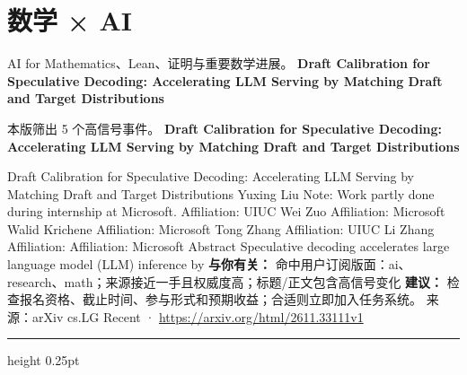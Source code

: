 \documentclass[10.5pt]{ctexart}
\begin{document}
\section*{数学 × AI}
{\color{ormuted} AI for Mathematics、Lean、证明与重要数学进展。}
\vspace{2mm}
{\LARGE\bfseries Draft Calibration for Speculative Decoding: Accelerating LLM Serving by Matching Draft and Target Distributions}\par
\vspace{1mm}
{\color{ormuted} 本版筛出 5 个高信号事件。}
\vspace{3mm}
{\Large\bfseries Draft Calibration for Speculative Decoding: Accelerating LLM Serving by Matching Draft and Target Distributions}\par
Draft Calibration for Speculative Decoding: Accelerating LLM Serving by Matching Draft and Target Distributions Yuxing Liu Note: Work partly done during internship at Microsoft. Affiliation: UIUC Wei Zuo Affiliation: Microsoft Walid Krichene Affiliation: Microsoft Tong Zhang Affiliation: UIUC Li Zhang Affiliation: Affiliation: Microsoft Abstract Speculative decoding accelerates large language model (LLM) inference by
\textbf{与你有关：} 命中用户订阅版面：ai、research、math；来源接近一手且权威度高；标题/正文包含高信号变化
\textbf{建议：} 检查报名资格、截止时间、参与形式和预期收益；合适则立即加入任务系统。
{\footnotesize\color{ormuted} 来源：arXiv cs.LG Recent · \url{https://arxiv.org/html/2611.33111v1}}
\vspace{4mm}
\hrule height 0.25pt
\vspace{3mm}
\end{document}
